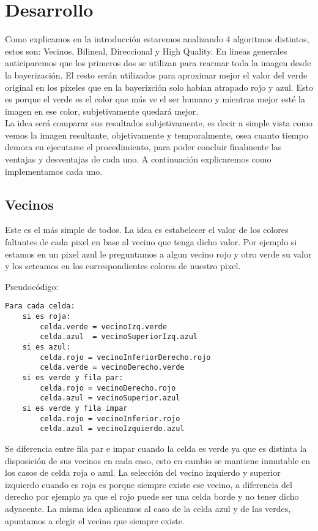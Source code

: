 \section{Desarrollo}

Como explicamos en la introducción estaremos analizando 4 algoritmos distintos, estos son: Vecinos, Bilineal, Direccional y High Quality. En lineas generales anticiparemos que los primeros dos se utilizan para rearmar toda la imagen desde la bayerización. El resto serán utilizados para aproximar mejor el valor del verde original en los píxeles que en la bayerizción solo habían atrapado rojo y azul. Esto es porque el verde es el color que más ve el ser humano y mientras mejor esté la imagen en ese color, subjetivamente quedará mejor.\\
La idea será comparar sus resultados subjetivamente, es decir a simple vista como 
vemos la imagen resultante, objetivamente y temporalmente, osea cuanto tiempo demora en ejecutarse el procedimiento, para poder concluir finalmente las ventajas y desventajas de cada uno. A continuación explicaremos como 
implementamos cada uno.\\


\subsection{Vecinos}
Este es el más simple de todos. La idea es estabelecer el valor de los colores faltantes de cada pixel en base al vecino que tenga dicho valor. Por ejemplo si estamos en un pixel azul le preguntamos a algun vecino rojo y 
otro verde su valor y los seteamos en los correspondientes colores de nuestro pixel.

Pseudocódigo:
\begin{lstlisting}[frame=single] 
Para cada celda:
	si es roja:
		celda.verde = vecinoIzq.verde
		celda.azul  = vecinoSuperiorIzq.azul	
	si es azul:
		celda.rojo = vecinoInferiorDerecho.rojo
		celda.verde = vecinoDerecho.verde
	si es verde y fila par:
		celda.rojo = vecinoDerecho.rojo
		celda.azul = vecinoSuperior.azul
	si es verde y fila impar
		celda.rojo = vecinoInferior.rojo
		celda.azul = vecinoIzquierdo.azul
\end{lstlisting}

Se diferencia entre fila par e impar cuando la celda es verde ya que es distinta la disposición de sus vecinos en cada caso, esto en cambio se mantiene inmutable en los casos de celda roja o azul. La selección del
vecino izquierdo y superior izquierdo cuando es roja es porque siempre existe ese vecino, a diferencia del derecho por ejemplo ya que el rojo puede ser una celda borde y no tener dicho adyacente. La misma idea aplicamos 
al caso de la celda azul y de las verdes, apuntamos a elegir el vecino que siempre existe.

